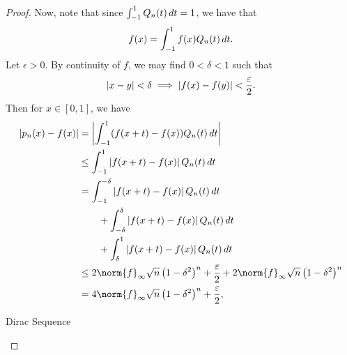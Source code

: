 \documentclass[notoc,notitlepage]{tufte-book}
\begin{document}
\begin{proof}
  Now, note that since $\int_{-1}^{1} Q_n(t) \mathop{}\!d{t} = 1$, we have that
  \begin{equation*}
    f(x) = \int_{-1}^{1} f(x) Q_n(t) \mathop{}\!d{t}.
  \end{equation*}
  Let $\epsilon > 0$. By continuity of $f$, we may find $0 < \delta < 1$ such that
  \begin{equation*}
    \left| x - y \right| < \delta \implies \left| f(x) - f(y) \right| < \frac{\varepsilon}{2}.
  \end{equation*}
  Then for $x \in [0, 1]$, we have
  \begin{align}
    \abs{ p_n(x) - f(x) } &= \abs{ \int_{-1}^{1} ( f(x + t) - f(x) ) Q_n(t) \dif{t} } \nonumber \\
                          &\leq \int_{-1}^{1} \abs{ f(x + t) - f(x) } Q_n(t) \dif{t} \nonumber \\
                          &= \int_{-1}^{-\delta} \abs{ f(x + t) - f(x) } Q_n(t) \dif{t} \nonumber \\
                          &\qquad + \int_{-\delta}^{\delta} \abs{ f(x + t) - f(x) } Q_n(t) \dif{t} \nonumber \\
                          &\qquad + \int_{\delta}^{1} \abs{ f(x + t) - f(x) } Q_n(t) \dif{t} \nonumber \\
                          &\leq 2 \norm{f}_\infty \sqrt{n} \left( 1 - \delta^2 \right)^n + \frac{\epsilon}{2} + 2 \norm{f}_\infty \sqrt{n} \left( 1 - \delta^2 \right)^n \label{eq:weierstrass_approx_eq1} \\
                          &= 4 \norm{f}_\infty \sqrt{n} \left( 1 - \delta^2 \right)^n + \frac{\epsilon}{2}, \nonumber
  \end{align}
  \begin{marginfigure}
    \centering
    \caption{Dirac Sequence}\label{fig:dirac_sequence}
  \end{marginfigure}
  \begin{marginfigure}
    \centering
\end{marginfigure}
\end{proof}
\end{document}
